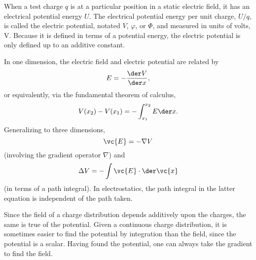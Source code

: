 When a test charge $q$ is at a particular position in a static electric field, it has an electrical
potential energy $U$. The electrical potential energy per unit charge, $U/q$, is
called the electric potential, notated $V$, $\varphi$, or $\Phi$, and measured
in units of volts, V. Because it is defined in terms of a potential energy, the
electric potential is only defined up to an additive constant.

In one dimension, the electric field and electric potential are related by
\begin{equation*}
  E = -\frac{\der V}{\der x},
\end{equation*}
or equivalently, via the fundamental theorem of calculus,
\begin{equation*}
  V(x_2)-V(x_1) = -\int_{x_1}^{x_2} E \der x.
\end{equation*}
Generalizing to three dimensions,
\begin{equation*}
  \vc{E} = -\nabla V
\end{equation*}
(involving the gradient operator $\nabla$) and
\begin{equation*}
  \Delta V = -\int \vc{E}\cdot\der\vc{x}
\end{equation*}
(in terms of a path integral).
In electrostatics, the path integral in the latter equation is independent
of the path taken.

Since the field of a charge distribution depends additively upon the
charges, the same is true of the potential. Given a continuous charge distribution,
it is sometimes easier to find the potential by integration than the field, since
the potential is a scalar. Having found the potential, one can always take the
gradient to find the field.

